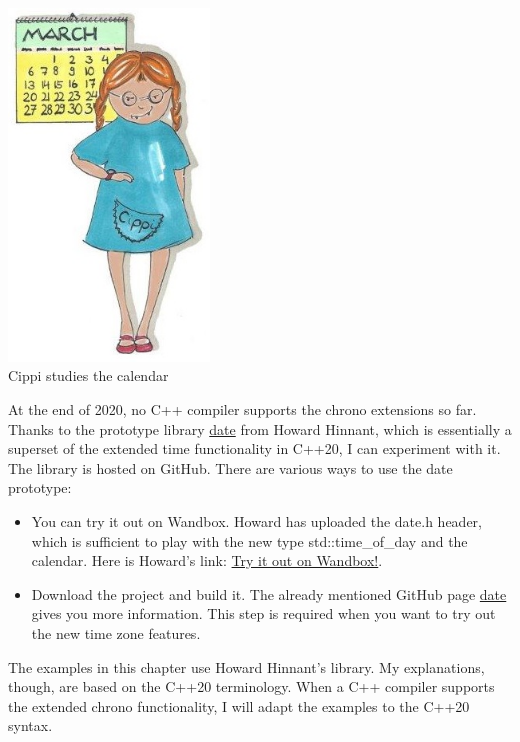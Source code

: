 \begin{center}
\includegraphics[width=0.4\textwidth]{content/3/chapter5/images/18.png}\\
Cippi studies the calendar
\end{center}

\begin{tcolorbox}[breakable,enhanced jigsaw,colback=blue!5!white,colframe=blue!75!black,title={Lack of Compiler Support}]
	
At the end of 2020, no C++ compiler supports the chrono extensions so far. Thanks to the prototype library \href{https://github.com/HowardHinnant/date}{date} from Howard Hinnant, which is essentially a superset of the extended time functionality in C++20, I can experiment with it. The library is hosted on GitHub. There are various ways to use the date prototype:

\begin{itemize}
\item 
You can try it out on Wandbox. Howard has uploaded the date.h header, which is sufficient to play with the new type std::time\_of\_day and the calendar. Here is Howard’s link: \href{https://wandbox.org/permlink/L8MwjzSSC3fXXrMd}{Try it out on Wandbox!}.

\item 
Download the project and build it. The already mentioned GitHub page \href{https://github.com/HowardHinnant/date}{date} gives you more information. This step is required when you want to try out the new time zone features.
\end{itemize}

The examples in this chapter use Howard Hinnant’s library. My explanations, though, are based on the C++20 terminology. When a C++ compiler supports the extended chrono functionality, I will adapt the examples to the C++20 syntax.

\end{tcolorbox}

